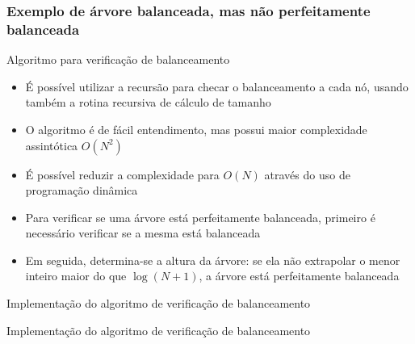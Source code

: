 \begin{frame}
\frametitle{Exemplo de árvore balanceada, mas não perfeitamente balanceada}


 \end{frame}
 
\begin{frame}[fragile]{Algoritmo para verificação de balanceamento}

	\begin{itemize}
        \item É possível utilizar a recursão para checar o balanceamento a cada nó,
            usando também a rotina recursiva de cálculo de tamanho

        \item O algoritmo é de fácil entendimento, mas possui maior complexidade
            assintótica $O(N^2)$
	
        \item É possível reduzir a complexidade para $O(N)$ através do uso de programação dinâmica

        \item Para verificar se uma árvore está perfeitamente balanceada, primeiro é 
                necessário verificar se a mesma está balanceada

        \item Em seguida, determina-se a altura da árvore: se ela não extrapolar o menor inteiro 
            maior do que $\log(N + 1)$, a árvore está perfeitamente balanceada
	\end{itemize}

\end{frame}

\begin{frame}[fragile]{Implementação do algoritmo de verificação de balanceamento}
\end{frame}

\begin{frame}[fragile]{Implementação do algoritmo de verificação de balanceamento}
\end{frame}
